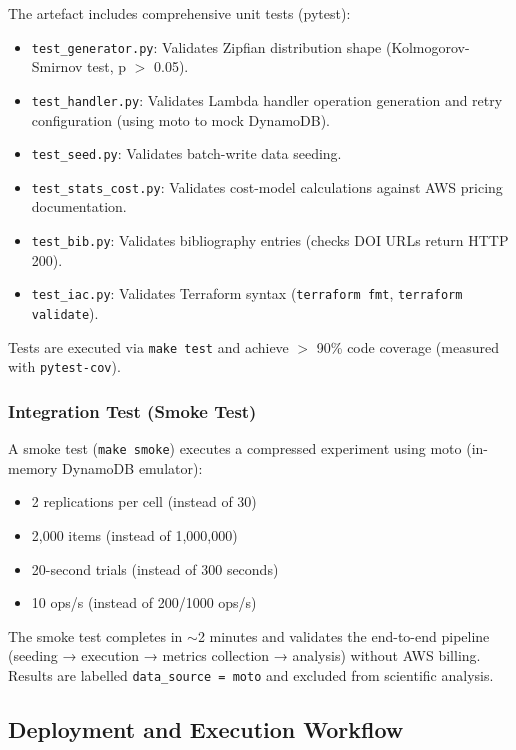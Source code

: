 The artefact includes comprehensive unit tests (pytest):

\begin{itemize}
    \item \texttt{test\_generator.py}: Validates Zipfian distribution shape (Kolmogorov-Smirnov test, p $>$ 0.05).
    \item \texttt{test\_handler.py}: Validates Lambda handler operation generation and retry configuration (using moto to mock DynamoDB).
    \item \texttt{test\_seed.py}: Validates batch-write data seeding.
    \item \texttt{test\_stats\_cost.py}: Validates cost-model calculations against AWS pricing documentation.
    \item \texttt{test\_bib.py}: Validates bibliography entries (checks DOI URLs return HTTP 200).
    \item \texttt{test\_iac.py}: Validates Terraform syntax (\texttt{terraform fmt}, \texttt{terraform validate}).
\end{itemize}

Tests are executed via \texttt{make test} and achieve $>$ 90\% code coverage (measured with \texttt{pytest-cov}).

\subsubsection{Integration Test (Smoke Test)}

A smoke test (\texttt{make smoke}) executes a compressed experiment using moto (in-memory DynamoDB emulator):

\begin{itemize}
    \item 2 replications per cell (instead of 30)
    \item 2,000 items (instead of 1,000,000)
    \item 20-second trials (instead of 300 seconds)
    \item 10 ops/s (instead of 200/1000 ops/s)
\end{itemize}

The smoke test completes in $\sim$2 minutes and validates the end-to-end pipeline (seeding → execution → metrics collection → analysis) without AWS billing. Results are labelled \texttt{data\_source = moto} and excluded from scientific analysis.

\subsection{Deployment and Execution Workflow}

